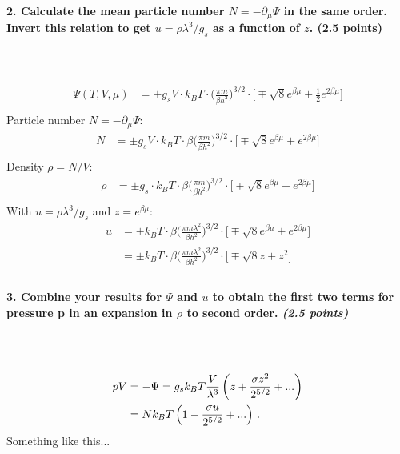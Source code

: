 \paragraph{2. Calculate the mean particle number 
    $N =-\partial_\mu\Psi$ in the same order. Invert this 
    relation to get $u=\rho\lambda^3/g_s$ as a function of $z$. 
    (2.5 points)
} \ \\
    \\
    \begin{align}
        \Psi(T,V,\mu)
        &=\pm g_sV\cdot k_BT\cdot\bigg(
            \frac{\pi m}{\beta h^2}
        \bigg)^{3/2}\cdot\bigg[
            \mp\sqrt{8}e^{\beta\mu}
            +\frac{1}{2}e^{2\beta\mu}
        \bigg] \\
    \end{align}
    Particle number $N=-\partial_\mu\Psi$:
    \begin{align}
        N
        &=\pm g_sV\cdot k_BT\cdot\beta\bigg(
            \frac{\pi m}{\beta h^2}
        \bigg)^{3/2}\cdot\bigg[
            \mp\sqrt{8}e^{\beta\mu}
            +e^{2\beta\mu}
        \bigg] \\
    \end{align}
    Density $\rho=N/V$:
    \begin{align}
        \rho&=\pm g_s\cdot k_BT\cdot\beta\bigg(
            \frac{\pi m}{\beta h^2}
        \bigg)^{3/2}\cdot\bigg[
            \mp\sqrt{8}e^{\beta\mu}
            +e^{2\beta\mu}
        \bigg] \\
    \end{align}
    With $u=\rho\lambda^3/g_s$ and $z=e^{\beta\mu}$:
    \begin{align}
        u
        &=\pm k_BT\cdot\beta\bigg(
            \frac{\pi m\lambda^2}{\beta h^2}
        \bigg)^{3/2}\cdot\bigg[
            \mp\sqrt{8}e^{\beta\mu}
            +e^{2\beta\mu}
        \bigg] \\
        &=\pm k_BT\cdot\beta\bigg(
            \frac{\pi m\lambda^2}{\beta h^2}
        \bigg)^{3/2}\cdot\bigg[
            \mp\sqrt{8}z
            +z^2
        \bigg] \\
    \end{align}

\paragraph{3. Combine your results for $\Psi$ and $u$ to obtain 
    the first two terms for pressure p in an expansion in 
    $\rho$ to second order. \textit{(2.5 points)}
} \ \\
    \\
    \begin{align}
    pV &= - \Psi = g_s k_B T \frac{V}{\lambda^3} \left(
    z + \frac{\sigma z^2}{2^{5/2}} + ... \right) \notag \\
    &= N k_B T \left( 1-\frac{\sigma u}{2^{5/2}} + ... \right) \,.
    \end{align}
    Something like this...


